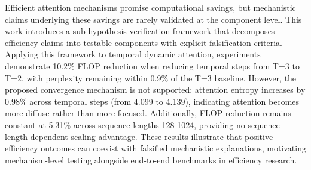 
Efficient attention mechanisms promise computational savings, but mechanistic claims underlying these savings are rarely validated at the component level. This work introduces a sub-hypothesis verification framework that decomposes efficiency claims into testable components with explicit falsification criteria. Applying this framework to temporal dynamic attention, experiments demonstrate 10.2\% FLOP reduction when reducing temporal steps from T=3 to T=2, with perplexity remaining within 0.9\% of the T=3 baseline. However, the proposed convergence mechanism is not supported: attention entropy increases by 0.98\% across temporal steps (from 4.099 to 4.139), indicating attention becomes more diffuse rather than more focused. Additionally, FLOP reduction remains constant at 5.31\% across sequence lengths 128-1024, providing no sequence-length-dependent scaling advantage. These results illustrate that positive efficiency outcomes can coexist with falsified mechanistic explanations, motivating mechanism-level testing alongside end-to-end benchmarks in efficiency research.

